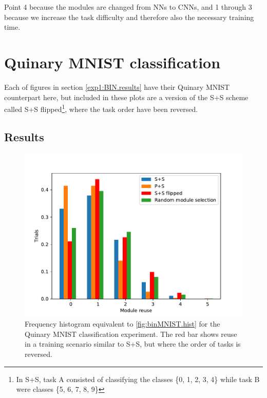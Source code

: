 Point 4 because the modules are changed from NNs to CNNs, and 1 through 3 because we increase the task difficulty and therefore also the necessary training time. 

\section{Quinary MNIST classification}
\label{exp1:results.quinary}
Each of figures in section \ref{exp1:BIN.results} have their Quinary MNIST counterpart here, but included in these plots are a version of the S+S scheme called S+S flipped\footnote{In S+S, task A consisted of classifying the classes \{0, 1, 2, 3, 4\} while task B were classes \{5, 6, 7, 8, 9\}}, where the task order have been reversed.

\subsection{Results}
\begin{figure}[t]
    \includegraphics[width=\textwidth]{Chapters/4.Experiments/exp1/figures/QUIN_module_reuse.pdf}
    \caption{Frequency histogram equivalent to \ref{fig:binMNIST.hist} for the Quinary MNIST classification experiment. The red bar shows reuse in a training scenario similar to S+S, but where the order of tasks is reversed.}
    \label{fig:quinMNIST.hist}
\end{figure}

